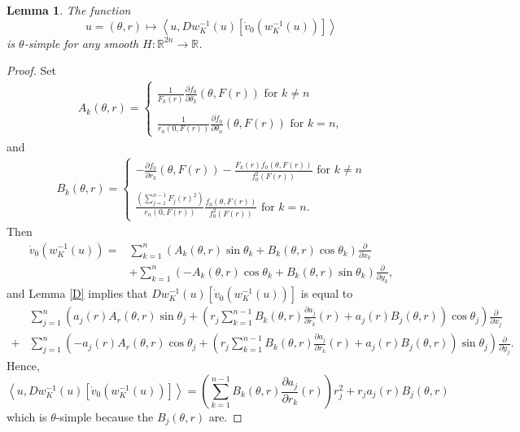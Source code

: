 \documentclass[12pt]{amsart}
\newtheorem{lemma}[theorem]{Lemma}
\theoremstyle{definition}
\newcommand{\RR}{{\mathbb R}}
\begin{document}
\begin{lemma}\label{Dvdot}
    The function $$u=(\theta,r) \mapsto \left\langle u, Dw_K^{-1}(u)\left[  \dot{v}_0(w_K^{-1}(u))\right] \right\rangle$$ is $\theta$-simple for any smooth $H \colon \RR^{2n}\to \RR$.
\end{lemma}



\begin{proof}
Set \begin{align*}
A_k(\theta,r) =
    \begin{cases}
    \displaystyle\frac{1}{F_k(r)}\frac{\partial \dot{f}_0}{\partial \theta_k}(\theta,F(r))\,\,\text{for}\,\,k \neq n\\\\
        \displaystyle \frac{1}{r_n(0,F(r))}\frac{\partial \dot{f}_0}{\partial \theta_n}(\theta,F(r)) \,\,\text{for}\,\,k=n,
    \end{cases}
\end{align*}
and 
\begin{align*}
B_k(\theta,r) =
    \begin{cases}
    \displaystyle-\frac{\partial \dot{f}_0}{\partial r_k}(\theta,F(r)) - \frac{F_k(r) \dot{f}_0(\theta,F(r))}{f^2_0(F(r))}\,\,\text{for}\,\,k \neq n\\\\
        \displaystyle \frac{(\sum_{j=1}^{n-1}F_j(r)^2)}{r_n(0,F(r))}\frac{\dot{f}_0(\theta,F(r))}{f^2_0(F(r))} \,\,\text{for}\,\,k=n.
    \end{cases}
\end{align*}
Then 
\begin{align*}
    \dot{v}_0(w_K^{-1}(u)) =& \sum_{k=1}^{n} \left(A_k(\theta,r) \sin \theta_k + B_k(\theta,r)
    \cos \theta_k \right)\frac{\partial}{\partial x_k} \\&+ \sum_{k=1}^{n} \left(-A_k(\theta,r) \cos \theta_k + B_k(\theta,r)
    \sin \theta_k \right)\frac{\partial}{\partial y_k},
\end{align*}
and Lemma \ref{D} implies that $Dw_K^{-1}(u)\left[  \dot{v}_0(w_K^{-1}(u))\right]$ is equal to
\begin{align*}
 &{}\sum_{j=1}^n \left( a_j(r)A_r(\theta,r)\sin \theta_j  + \left(r_j\sum_{k=1}^{n-1}B_k(\theta,r) \frac{\partial a_j}{\partial r_k}(r) +a_j(r)B_j(\theta,r)\right)\cos \theta_j  \right)\frac{\partial}{\partial x_j}\\+&\sum_{j=1}^n \left( -a_j(r)A_r(\theta,r)\cos \theta_j  + \left(r_j\sum_{k=1}^{n-1}B_k(\theta,r) \frac{\partial a_j}{\partial r_k}(r) +a_j(r)B_j(\theta,r)\right)\sin \theta_j\right)\frac{\partial}{\partial y_j}.
\end{align*}
Hence,
$$
\left\langle u, Dw_K^{-1}(u)\left[  \dot{v}_0(w_K^{-1}(u))\right] \right\rangle = \left(\sum_{k=1}^{n-1}B_k(\theta,r) \frac{\partial a_j}{\partial r_k}(r)\right)r^2_j +r_ja_j(r)B_j(\theta,r)
$$
which is $\theta$-simple because the $B_j(\theta,r)$ are.

\end{proof}
\end{document}
